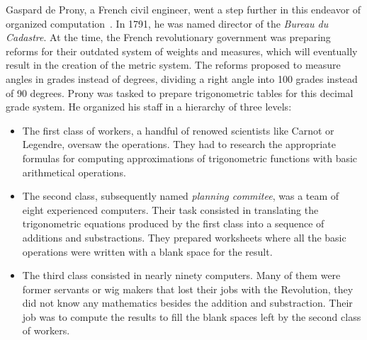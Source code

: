         Gaspard de Prony, a French civil engineer, went a step further in this endeavor of organized
        computation~\cite[Chapter~2]{human_computers}. In 1791, he was named director of the \emph{Bureau du Cadastre}.
        At the time, the French revolutionary government was preparing reforms for their outdated system of weights and
        measures, which will eventually result in the creation of the metric system. The reforms proposed to measure
        angles in grades instead of degrees, dividing a right angle into 100 grades instead of 90 degrees. Prony was
        tasked to prepare trigonometric tables for this decimal grade system. He organized his staff in a hierarchy of
        three levels:
        \begin{itemize}
            \item The first class of workers, a handful of renowed scientists like Carnot or Legendre, oversaw the
                operations. They had to research the appropriate formulas for computing approximations of trigonometric
                functions with basic arithmetical operations.
            \item The second class, subsequently named \emph{planning commitee}, was a team of eight experienced
                computers. Their task consisted in translating the trigonometric equations produced by the first class
                into a sequence of additions and substractions. They prepared worksheets where all the basic operations
                were written with a blank space for the result.
            \item The third class consisted in nearly ninety computers. Many of them were former servants or wig makers
                that lost their jobs with the Revolution, they did not know any mathematics besides the addition and
                substraction. Their job was to compute the results to fill the blank spaces left by the second class of
                workers.
        \end{itemize}

